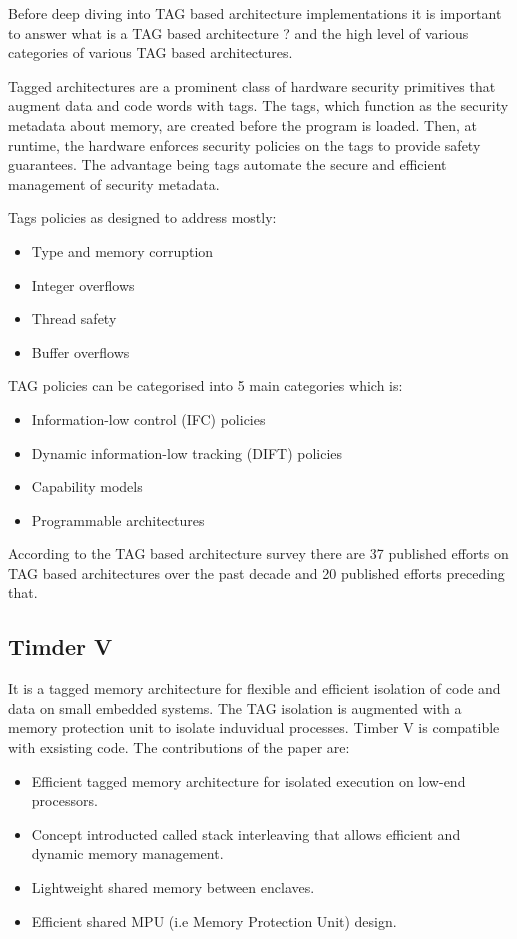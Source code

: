 Before deep diving into TAG based architecture implementations it is important to 
answer what is a TAG based architecture ? and the high level of various 
categories of various TAG based architectures.

Tagged architectures are a prominent class of hardware security primitives that augment data and code words
with tags. The tags, which function as the security metadata
about memory, are created before the program is loaded. 
Then, at runtime, the hardware enforces security policies on the tags to provide safety guarantees. 
The advantage being tags automate the secure and efficient management of security metadata. 

Tags policies as designed to address mostly:
\begin{itemize}
  \item Type and memory corruption
  \item Integer overflows
  \item Thread safety
  \item Buffer overflows
\end{itemize}

TAG policies can be categorised into 5 main categories which is:
\begin{itemize}
  \item Information-low control (IFC) policies
  \item Dynamic information-low tracking (DIFT) policies
  \item Capability models
  \item Programmable architectures
\end{itemize}
 
According to the TAG based architecture survey \cite{acmTAGSurvey} there are 37 published
efforts on TAG based architectures over the past decade and 20 published efforts preceding that. 

\subsection{Timder V \cite{weiser_timber-v_2019}}
 It is a tagged memory architecture for flexible and efficient isolation of code and data on 
 small embedded systems. The TAG isolation is augmented with a memory protection unit to isolate 
 induvidual processes. Timber V is compatible with exsisting code. The contributions of the paper 
 are: 
 \begin{itemize}
  \item Efficient tagged memory architecture for isolated execution on low-end processors. 
  \item Concept introducted called stack interleaving that allows efficient and dynamic memory management. 
  \item Lightweight shared memory between enclaves. 
  \item Efficient shared MPU (i.e Memory Protection Unit) design. 
 \end{itemize}
 

